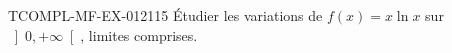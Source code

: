 \begin{exercice}{TCOMPL-MF-EX-012}{1}{15}
Étudier les variations de $f(x) = x\ln x$ sur $\left]0, +\infty\right[$, limites comprises.

\end{exercice}
